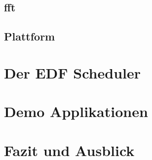 \documentclass{scrartcl}
\begin{document}
		\subsection{\ac{fft}} \label{section:fft}
			
		\subsection{Plattform} \label{section:plattform}
			
	\clearpage
	\section{Der EDF Scheduler} \label{section:der_edf_scheduler}
		
	\clearpage
	\section{Demo Applikationen} \label{section:demo_applikationen}
		
	\clearpage
	\section{Fazit und Ausblick}
		
	\clearpage
	\listoffigures
	\clearpage
	\listoftables
	\clearpage
	\printbibliography{}
	\clearpage
\end{document}
